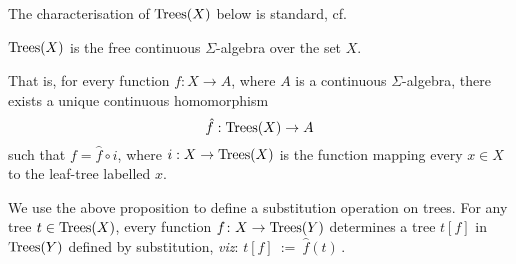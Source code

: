 The characterisation of $\textnormal{Trees}(X)$ below is standard, cf.\
\todo[inline]{[[REFERENCES]]}
\begin{proposition}
$\textnormal{Trees}(X)$ is the free
    continuous $\Sigma$-algebra over the set $X$.
   \begin{center}
    \end{center}
    That is, for every function $f : X \to A$, where 
    $A$ is a continuous $\Sigma$-algebra,
    there exists a unique continuous homomorphism $$\hat{f} : \textnormal{Trees}(X) \to A$$
    such that $
        f = \hat{f} \circ i $, where $i : X \to \textnormal{Trees}(X)$ is the function mapping every $x \in X$ to the 
        leaf-tree labelled $x$.
 \end{proposition}
 
 We use the above proposition to define a substitution operation on trees. For any tree $t \in \textnormal{Trees}(X)$, 
 every function $f \colon X \to \textnormal{Trees}(Y)$ determines a tree $t[f]$ in $\textnormal{Trees}(Y)$ defined by substitution, \emph{viz}:
 $t[f] ~ := ~ \hat{f}(t)\,$.
 
